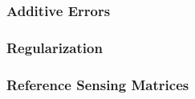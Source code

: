 \subsubsection{Additive Errors}
\label{subsubsec:sim_study_params_obs_errors}


\subsubsection{Regularization}
\label{subsubsec:sim_study_params_regularization}


\subsubsection{Reference Sensing Matrices}
\label{subsubsec:sim_study_params_ref_sens_mat}

